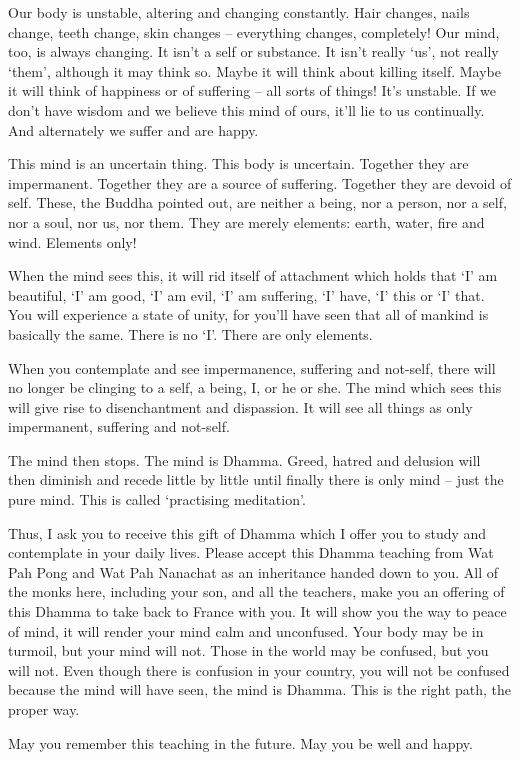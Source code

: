  Our body is unstable, altering and changing constantly. Hair changes, nails change, teeth change, skin changes -- everything changes, completely! Our mind, too, is always changing. It isn't a self or substance. It isn't really `us', not really `them', although it may think so. Maybe it will think about killing itself. Maybe it will think of happiness or of suffering -- all sorts of things! It's unstable. If we don't have wisdom and we believe this mind of ours, it'll lie to us continually. And alternately we suffer and are happy. 

 This mind is an uncertain thing. This body is uncertain. Together they are impermanent. Together they are a source of suffering. Together they are devoid of self. These, the Buddha pointed out, are neither a being, nor a person, nor a self, nor a soul, nor us, nor them. They are merely elements: earth, water, fire and wind. Elements only! 

 When the mind sees this, it will rid itself of attachment which holds that `I' am beautiful, `I' am good, `I' am evil, `I' am suffering, `I' have, `I' this or `I' that. You will experience a state of unity, for you'll have seen that all of mankind is basically the same. There is no `I'. There are only elements. 

 When you contemplate and see impermanence, suffering and not-self, there will no longer be clinging to a self, a being, I, or he or she. The mind which sees this will give rise to  disenchantment and dispassion. It will see all things as only impermanent, suffering and not-self.

 The mind then stops. The mind is Dhamma. Greed, hatred and delusion will then diminish and recede little by little until finally there is only mind -- just the pure mind. This is called `practising meditation'. 

 Thus, I ask you to receive this gift of Dhamma which I offer you to study and contemplate in your daily lives. Please accept this Dhamma teaching from Wat Pah Pong and Wat Pah Nanachat as an inheritance handed down to you. All of the monks here, including your son, and all the teachers, make you an offering of this Dhamma to take back to France with you. It will show you the way to peace of mind, it will render your mind calm and unconfused. Your body may be in turmoil, but your mind will not. Those in the world may be confused, but you will not. Even though there is confusion in your country, you will not be confused because the mind will have seen, the mind is Dhamma. This is the right path, the proper way. 

May you remember this teaching in the future. May you be well and happy.

